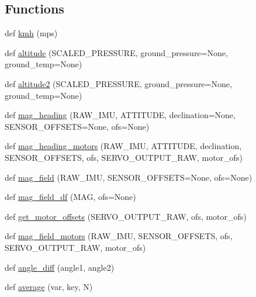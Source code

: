\subsection*{Functions}
\begin{DoxyCompactItemize}
\item 
def \hyperlink{namespacepymavlink_1_1mavextra_a763fb9e3242f5ec9ec1fec177c4e50ae}{kmh} (mps)
\item 
def \hyperlink{namespacepymavlink_1_1mavextra_abb4bb839562172e4585d794e68856b14}{altitude} (S\+C\+A\+L\+E\+D\+\_\+\+P\+R\+E\+S\+S\+U\+RE, ground\+\_\+pressure=None, ground\+\_\+temp=None)
\item 
def \hyperlink{namespacepymavlink_1_1mavextra_af5dcda30d85d910c246199de4189750f}{altitude2} (S\+C\+A\+L\+E\+D\+\_\+\+P\+R\+E\+S\+S\+U\+RE, ground\+\_\+pressure=None, ground\+\_\+temp=None)
\item 
def \hyperlink{namespacepymavlink_1_1mavextra_aa27cdc29ee82e3515eace9a8a98c331b}{mag\+\_\+heading} (R\+A\+W\+\_\+\+I\+MU, A\+T\+T\+I\+T\+U\+DE, declination=None, S\+E\+N\+S\+O\+R\+\_\+\+O\+F\+F\+S\+E\+TS=None, ofs=None)
\item 
def \hyperlink{namespacepymavlink_1_1mavextra_aed3e1ad61d9f219e180e9e3ac94764fe}{mag\+\_\+heading\+\_\+motors} (R\+A\+W\+\_\+\+I\+MU, A\+T\+T\+I\+T\+U\+DE, declination, S\+E\+N\+S\+O\+R\+\_\+\+O\+F\+F\+S\+E\+TS, ofs, S\+E\+R\+V\+O\+\_\+\+O\+U\+T\+P\+U\+T\+\_\+\+R\+AW, motor\+\_\+ofs)
\item 
def \hyperlink{namespacepymavlink_1_1mavextra_ae2c6b9c7ca47d69bc730cfc544c41b62}{mag\+\_\+field} (R\+A\+W\+\_\+\+I\+MU, S\+E\+N\+S\+O\+R\+\_\+\+O\+F\+F\+S\+E\+TS=None, ofs=None)
\item 
def \hyperlink{namespacepymavlink_1_1mavextra_a4bdc6d85f92efa62d773a8609aabaa32}{mag\+\_\+field\+\_\+df} (M\+AG, ofs=None)
\item 
def \hyperlink{namespacepymavlink_1_1mavextra_a5c02a6aebf8c43eef46c2aad3b75623a}{get\+\_\+motor\+\_\+offsets} (S\+E\+R\+V\+O\+\_\+\+O\+U\+T\+P\+U\+T\+\_\+\+R\+AW, ofs, motor\+\_\+ofs)
\item 
def \hyperlink{namespacepymavlink_1_1mavextra_afd8e63b1dd36777b854b99782f284831}{mag\+\_\+field\+\_\+motors} (R\+A\+W\+\_\+\+I\+MU, S\+E\+N\+S\+O\+R\+\_\+\+O\+F\+F\+S\+E\+TS, ofs, S\+E\+R\+V\+O\+\_\+\+O\+U\+T\+P\+U\+T\+\_\+\+R\+AW, motor\+\_\+ofs)
\item 
def \hyperlink{namespacepymavlink_1_1mavextra_a4c518cade632dd29062b09b919c4f9e1}{angle\+\_\+diff} (angle1, angle2)
\item 
def \hyperlink{namespacepymavlink_1_1mavextra_a3953775074e771143256576a19fab8d3}{average} (var, key, N)

\end{DoxyCompactItemize}
